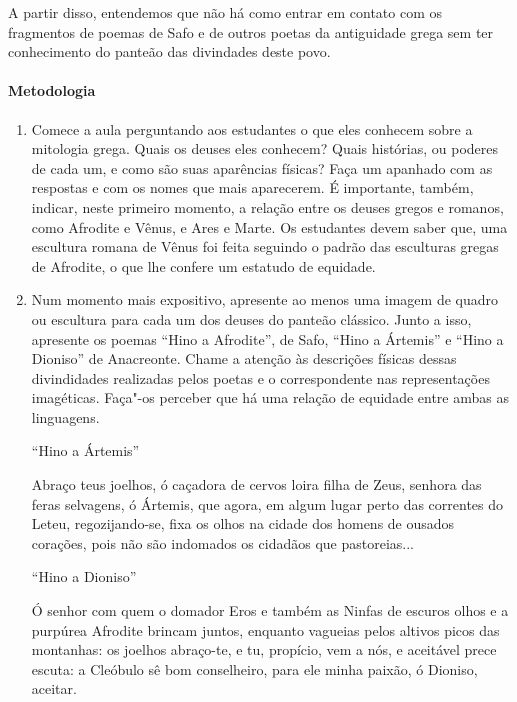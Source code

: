 \documentclass[12pt]{extarticle}
\begin{document}
A partir disso, entendemos que não há como entrar em contato com os fragmentos 
de poemas de Safo e de outros poetas da antiguidade grega sem ter conhecimento 
do panteão das divindades deste povo.


\paragraph{Metodologia}

\begin{enumerate}

	\item
	Comece a aula perguntando aos estudantes o que eles conhecem sobre 
	a mitologia grega. Quais os deuses eles conhecem? Quais histórias,
	ou poderes de cada um, e como são suas aparências físicas? Faça um apanhado
	com as respostas e com os nomes que mais aparecerem. É importante, também,
	indicar, neste primeiro momento, a relação entre os deuses gregos e romanos,
	como Afrodite e Vênus, e Ares e Marte. Os estudantes devem saber que, uma escultura
	romana de Vênus foi feita seguindo o padrão das esculturas gregas de Afrodite,
	o que lhe confere um estatudo de equidade. 

	\item
	Num momento mais expositivo, apresente ao menos uma imagem de quadro ou escultura
	para cada um dos deuses do panteão clássico.  Junto a isso, apresente os poemas
	``Hino a Afrodite'', de Safo, ``Hino a Ártemis'' e ``Hino a Dioniso'' de Anacreonte.
	Chame a atenção às descrições físicas dessas divindidades realizadas pelos poetas
	e o correspondente nas representações imagéticas. Faça"-os perceber que há uma
	relação de equidade entre ambas as linguagens. 

 	``Hino a Ártemis''

	Abraço teus joelhos, ó caçadora de cervos
	loira filha de Zeus, senhora 
	das feras selvagens, ó Ártemis,
	que agora, em algum lugar perto
	das correntes do Leteu, regozijando-se,
	fixa os olhos na cidade dos homens
	de ousados corações, pois não são indomados
	os cidadãos que pastoreias...

	``Hino a Dioniso''

	Ó senhor com quem o domador Eros
	e também as Ninfas de escuros olhos 
	e a purpúrea Afrodite
	brincam juntos, enquanto vagueias 
	pelos altivos picos das montanhas:
	os joelhos abraço-te, e tu, propício,
	vem a nós, e aceitável
	prece escuta:
	a Cleóbulo sê bom
	conselheiro, para ele minha paixão,
	ó Dioniso, aceitar. 


\end{enumerate}
\end{document}

